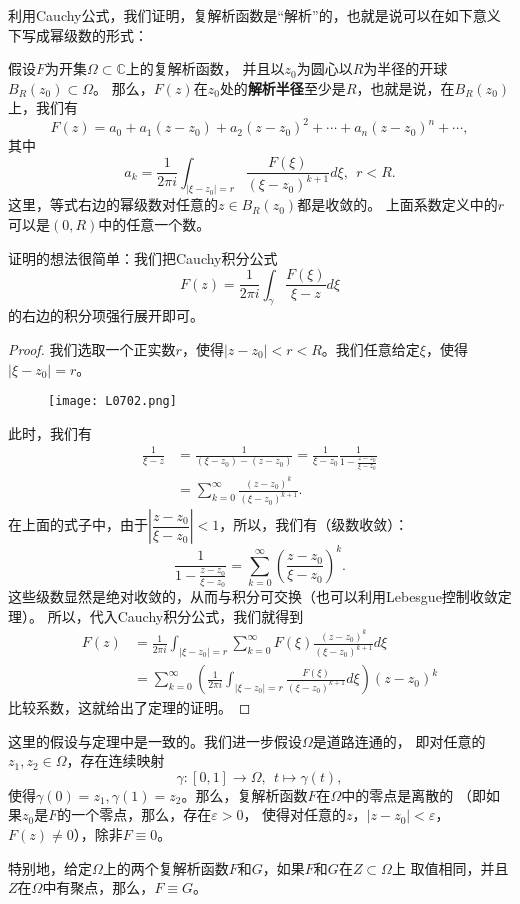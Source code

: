 利用Cauchy公式，我们证明，复解析函数是``解析''的，也就是说可以在如下意义下写成幂级数的形式：
\begin{theorem}
假设$F$为开集$\Omega\subset \mathbb{C}$上的复解析函数，
并且以$z_0$为圆心以$R$为半径的开球$B_R(z_0)\subset \Omega$。
那么，$F(z)$在$z_0$处的\textbf{解析半径}至少是$R$，也就是说，在$B_R(z_0)$上，我们有
\begin{equation*}
F(z)=a_0+a_1(z-z_0)+a_2(z-z_0)^2+\cdots+a_n(z-z_0)^n+\cdots,
\end{equation*}
其中
\[a_k=\frac{1}{2\pi i}\int_{|\xi-z_0|=r}\frac{F(\xi)}{(\xi-z_0)^{k+1}}d\xi, \ \ r<R.\]
这里，等式右边的幂级数对任意的$z\in B_R(z_0)$都是收敛的。
上面系数定义中的$r$可以是$(0,R)$中的任意一个数。
\end{theorem}
证明的想法很简单：我们把Cauchy积分公式
\begin{equation*}
F(z)=\frac{1}{2\pi i}\int_\gamma \frac{F(\xi)}{\xi-z}d\xi
\end{equation*}
的右边的积分项强行展开即可。
\begin{proof}
我们选取一个正实数$r$，使得$|z-z_0|<r<R$。我们任意给定$\xi$，使得$|\xi-z_0|=r$。
\begin{figure}[H]
    \centering
    \texttt{[image: L0702.png]}
    \caption{}
\end{figure}
此时，我们有
\begin{align*}
\frac{1}{\xi-z}&=\frac{1}{(\xi-z_0)-(z-z_0)}=\frac{1}{\xi-z_0}\frac{1}{1-\frac{z-z_0}{\xi-z_0}}\\
&=\sum_{k=0}^\infty \frac{(z-z_0)^k}{(\xi-z_0)^{k+1}}.
\end{align*}
在上面的式子中，由于$\left|\dfrac{z-z_0}{\xi-z_0}\right|<1$，所以，我们有（级数收敛）：
\[\frac{1}{1-\frac{z-z_0}{\xi-z_0}}=\sum_{k=0}^\infty \left(\frac{z-z_0}{\xi-z_0}\right)^k.\]
这些级数显然是绝对收敛的，从而与积分可交换（也可以利用Lebesgue控制收敛定理）。
所以，代入Cauchy积分公式，我们就得到
\begin{align*}
F(z)&=\frac{1}{2\pi i}\int_{|\xi-z_0|=r} \sum_{k=0}^\infty  F(\xi)\frac{(z-z_0)^k}{(\xi-z_0)^{k+1}}d\xi\\
&= \sum_{k=0}^\infty   \left(\frac{1}{2\pi i}\int_{|\xi-z_0|=r}\frac{F(\xi)}{(\xi-z_0)^{k+1}}d\xi \right)(z-z_0)^k
\end{align*}
比较系数，这就给出了定理的证明。
\end{proof}
\begin{corollary}[零点的离散性]
这里的假设与定理中是一致的。我们进一步假设$\Omega$是道路连通的，
即对任意的$z_1,z_2\in \Omega$，存在连续映射
\[\gamma\colon[0,1]\rightarrow \Omega, \ \ t\mapsto \gamma(t),\]
使得$\gamma(0)=z_1,\gamma(1)=z_2$。那么，复解析函数$F$在$\Omega$中的零点是离散的
（即如果$z_0$是$F$的一个零点，那么，存在$\varepsilon>0$，
使得对任意的$z$，$|z-z_0|<\varepsilon$，$F(z)\neq 0$），除非$F\equiv 0$。

特别地，给定$\Omega$上的两个复解析函数$F$和$G$，如果$F$和$G$在$Z\subset \Omega$上
取值相同，并且$Z$在$\Omega$中有聚点，那么，$F\equiv G$。
\end{corollary}
